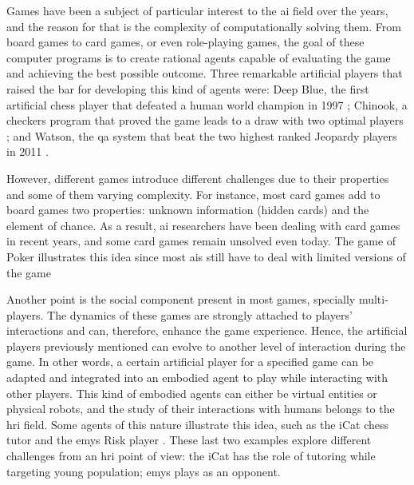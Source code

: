 \label{chapter:introduction}

Games have been a subject of particular interest to the \ac{ai} field over the years, and the reason for that is the complexity of computationally solving them.
From board games to card games, or even role-playing games, the goal of these computer programs is to create rational agents capable of evaluating the game and achieving the best possible outcome.
Three remarkable artificial players that raised the bar for developing this kind of agents were: Deep Blue, the first artificial chess player that defeated a human world champion in 1997 \cite{Campbell2002}; Chinook, a checkers program that proved the game leads to a draw with two optimal players \cite{Schaeffer1996}; and Watson, the \ac{qa} system that beat the two highest ranked Jeopardy players in 2011 \cite{Ferrucci2010}.

However, different games introduce different challenges due to their properties and some of them varying complexity.
For instance, most card games add to board games two properties: unknown information (hidden cards) and the element of chance.
As a result, \ac{ai} researchers have been dealing with card games in recent years, and some card games remain unsolved even today.
The game of Poker illustrates this idea since most \acp{ai} still have to deal with limited versions of the game\cite{Zinkevich}

Another point is the social component present in most games, specially multi-players.
The dynamics of these games are strongly attached to players' interactions and can, therefore, enhance the game experience.
Hence, the artificial players previously mentioned can evolve to another level of interaction during the game.
In other words, a certain artificial player for a specified game can be adapted and integrated into an embodied agent to play while interacting with other players.
This kind of embodied agents can either be virtual entities or physical robots, and the study of their interactions with humans belongs to the \ac{hri} field.
Some agents of this nature illustrate this idea, such as the iCat chess tutor \cite{Affective2007} and the \ac{emys} Risk player \cite{Pereira}.
These last two examples explore different challenges from an \ac{hri} point of view: the iCat has the role of tutoring while targeting young population; \ac{emys} plays as an opponent.

